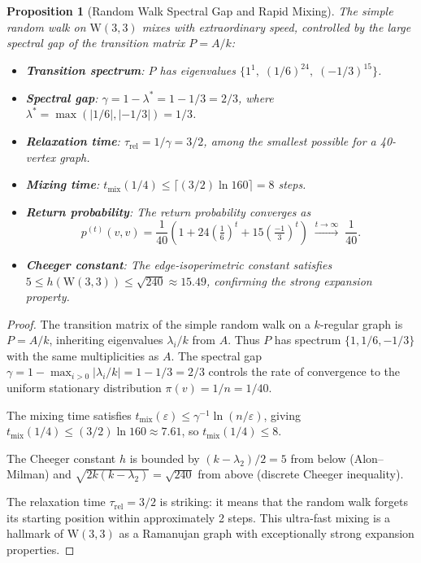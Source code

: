 \documentclass[12pt,a4paper]{article}
\newtheorem{proposition}[theorem]{Proposition}
\newcommand{\W}{\mathrm{W}(3,3)}
\begin{document}
\begin{proposition}[Random Walk Spectral Gap and Rapid Mixing]\label{prop:randomwalk}
The simple random walk on $\W$ mixes with extraordinary speed, controlled by the
large spectral gap of the transition matrix $P = A/k$:
\begin{itemize}
  \item \textbf{Transition spectrum}: $P$ has eigenvalues
        $\{1^1,\; (1/6)^{24},\; (-1/3)^{15}\}$.
  \item \textbf{Spectral gap}: $\gamma = 1 - \lambda^* = 1 - 1/3 = 2/3$,
        where $\lambda^* = \max(|1/6|, |-1/3|) = 1/3$.
  \item \textbf{Relaxation time}: $\tau_{\mathrm{rel}} = 1/\gamma = 3/2$,
        among the smallest possible for a 40-vertex graph.
  \item \textbf{Mixing time}: $t_{\mathrm{mix}}(1/4) \le \lceil(3/2)\ln 160\rceil = 8$ steps.
  \item \textbf{Return probability}: The return probability converges as
        \[
          p^{(t)}(v,v) = \frac{1}{40}\!\left(1 + 24\!\left(\tfrac{1}{6}\right)^{\!t}
            + 15\!\left(\tfrac{-1}{3}\right)^{\!t}\right)
          \;\xrightarrow{t\to\infty}\; \frac{1}{40}.
        \]
  \item \textbf{Cheeger constant}: The edge-isoperimetric constant satisfies
        $5 \le h(\W) \le \sqrt{240} \approx 15.49$,
        confirming the strong expansion property.
\end{itemize}
\end{proposition}

\begin{proof}
The transition matrix of the simple random walk on a $k$-regular graph is $P = A/k$, inheriting
eigenvalues $\lambda_i/k$ from $A$.  Thus $P$ has spectrum $\{1, 1/6, -1/3\}$ with the same
multiplicities as $A$.  The spectral gap $\gamma = 1 - \max_{i>0}|\lambda_i/k|
= 1 - 1/3 = 2/3$ controls the rate of convergence to the uniform stationary distribution
$\pi(v) = 1/n = 1/40$.

The mixing time satisfies $t_{\mathrm{mix}}(\varepsilon) \le \gamma^{-1}\ln(n/\varepsilon)$,
giving $t_{\mathrm{mix}}(1/4) \le (3/2)\ln 160 \approx 7.61$, so $t_{\mathrm{mix}}(1/4) \le 8$.

The Cheeger constant $h$ is bounded by $(k-\lambda_2)/2 = 5$ from below (Alon--Milman) and
$\sqrt{2k(k-\lambda_2)} = \sqrt{240}$ from above (discrete Cheeger inequality).

The relaxation time $\tau_{\mathrm{rel}} = 3/2$ is striking: it means that the random walk
forgets its starting position within approximately 2 steps.
This ultra-fast mixing is a hallmark of $\W$ as a Ramanujan graph with exceptionally
strong expansion properties.
\end{proof}
\end{document}
